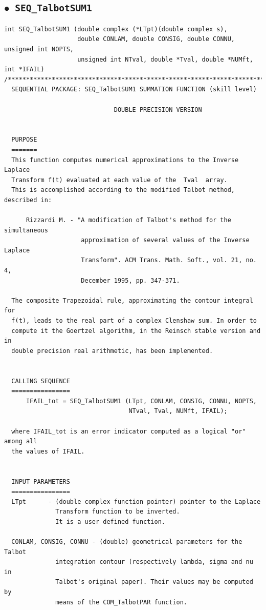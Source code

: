 \documentclass[a4paper,10pt]{report}%
\begin{document}
\subsection{\texorpdfstring{$\boldsymbol{\bullet}$}{ - }{\tt\ SEQ\_TalbotSUM1}}
\begin{lstlisting}
int SEQ_TalbotSUM1 (double complex (*LTpt)(double complex s),
                    double CONLAM, double CONSIG, double CONNU, unsigned int NOPTS,
                    unsigned int NTval, double *Tval, double *NUMft, int *IFAIL)
/*****************************************************************************
  SEQUENTIAL PACKAGE: SEQ_TalbotSUM1 SUMMATION FUNCTION (skill level)

                              DOUBLE PRECISION VERSION


  PURPOSE
  =======
  This function computes numerical approximations to the Inverse Laplace
  Transform f(t) evaluated at each value of the  Tval  array.
  This is accomplished according to the modified Talbot method, described in:

      Rizzardi M. - "A modification of Talbot's method for the simultaneous
                     approximation of several values of the Inverse Laplace
                     Transform". ACM Trans. Math. Soft., vol. 21, no. 4,
                     December 1995, pp. 347-371.

  The composite Trapezoidal rule, approximating the contour integral for
  f(t), leads to the real part of a complex Clenshaw sum. In order to
  compute it the Goertzel algorithm, in the Reinsch stable version and in
  double precision real arithmetic, has been implemented.


  CALLING SEQUENCE
  ================
      IFAIL_tot = SEQ_TalbotSUM1 (LTpt, CONLAM, CONSIG, CONNU, NOPTS,
                                  NTval, Tval, NUMft, IFAIL);

  where IFAIL_tot is an error indicator computed as a logical "or" among all
  the values of IFAIL.


  INPUT PARAMETERS
  ================
  LTpt      - (double complex function pointer) pointer to the Laplace
              Transform function to be inverted.
              It is a user defined function.

  CONLAM, CONSIG, CONNU - (double) geometrical parameters for the Talbot
              integration contour (respectively lambda, sigma and nu in
              Talbot's original paper). Their values may be computed by
              means of the COM_TalbotPAR function.


\end{lstlisting}
\end{document}
